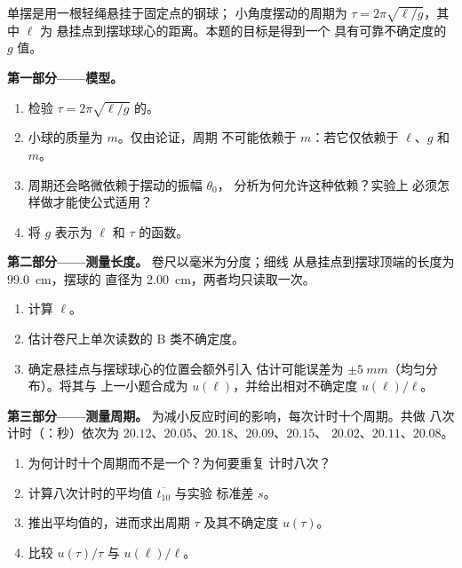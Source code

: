 \begin{problem}
\label{pb:b1:units-dimensions:1}
单摆是用一根轻绳悬挂于固定点的钢球；
小角度摆动的周期为 $\tau = 2\pi\sqrt{\ell/g}$，其中 $\ell$ 为
悬挂点到摆球球心的距离。本题的目标是得到一个
具有可靠不确定度的 $g$ 值。

\medskip
\noindent\textbf{第一部分——模型。}
\begin{enumerate}
  \item 检验 $\tau = 2\pi\sqrt{\ell/g}$ 的。
  \item 小球的质量为 $m$。仅由论证，周期
        不可能依赖于 $m$：若它仅依赖于 $\ell$、$g$
        和 $m$。
  \item 周期还会略微依赖于摆动的振幅 $\theta_0$，
        分析为何允许这种依赖？实验上
        必须怎样做才能使公式适用？
  \item 将 $g$ 表示为 $\ell$ 和 $\tau$ 的函数。
\end{enumerate}

\medskip
\noindent\textbf{第二部分——测量长度。}
卷尺以毫米为分度；细线
从悬挂点到摆球顶端的长度为 \qty{99.0}{cm}，摆球的
直径为 \qty{2.00}{cm}，两者均只读取一次。
\begin{enumerate}[resume]
  \item 计算 $\ell$。
  \item 估计卷尺上单次读数的
        B 类不确定度。
  \item 确定悬挂点与摆球球心的位置会额外引入
        估计可能误差为 $\pm\qty{5}{mm}$（均匀分布）。将其与
        上一小题合成为 $u(\ell)$，并给出相对不确定度
        $u(\ell)/\ell$。
\end{enumerate}

\medskip
\noindent\textbf{第三部分——测量周期。}
为减小反应时间的影响，每次计时十个周期。共做
八次计时（：秒）依次为 $20.12$、$20.05$、$20.18$、$20.09$、$20.15$、
$20.02$、$20.11$、$20.08$。
\begin{enumerate}[resume]
  \item 为何计时十个周期而不是一个？为何要重复
        计时八次？
  \item 计算八次计时的平均值 $\overline{t_{10}}$ 与实验
        标准差 $s$。
  \item 推出平均值的，进而求出周期
        $\tau$ 及其不确定度 $u(\tau)$。
  \item 比较 $u(\tau)/\tau$ 与 $u(\ell)/\ell$。
\end{enumerate}


\end{problem}
